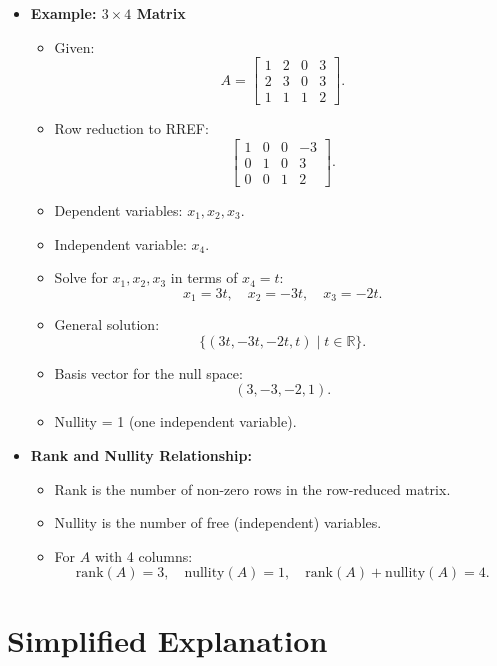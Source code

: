 \documentclass{article}
\begin{document}
\begin{itemize}
  \item \textbf{Example: $3 \times 4$ Matrix}
    \begin{itemize}
      \item Given:
        \[
          A =
          \begin{bmatrix}
            1 & 2 & 0 & 3 \\
            2 & 3 & 0 & 3 \\
            1 & 1 & 1 & 2
          \end{bmatrix}.
        \]
      \item Row reduction to RREF:
        \[
          \begin{bmatrix}
            1 & 0 & 0 & -3 \\
            0 & 1 & 0 & 3 \\
            0 & 0 & 1 & 2
          \end{bmatrix}.
        \]
      \item Dependent variables: $x_1, x_2, x_3$.
      \item Independent variable: $x_4$.
      \item Solve for $x_1, x_2, x_3$ in terms of $x_4 = t$:
        \[
          x_1 = 3t, \quad x_2 = -3t, \quad x_3 = -2t.
        \]
      \item General solution:
        \[
          \{(3t, -3t, -2t, t) \mid t \in \mathbb{R}\}.
        \]
      \item Basis vector for the null space:
        \[
          (3, -3, -2, 1).
        \]
      \item Nullity = 1 (one independent variable).
    \end{itemize}

  \item \textbf{Rank and Nullity Relationship:}
    \begin{itemize}
      \item Rank is the number of non-zero rows in the row-reduced matrix.
      \item Nullity is the number of free (independent) variables.
      \item For $A$ with 4 columns:
        \[
          \text{rank}(A) = 3, \quad \text{nullity}(A) = 1, \quad \text{rank}(A) + \text{nullity}(A) = 4.
        \]
    \end{itemize}
\end{itemize}

\section*{Simplified Explanation}
\end{document}
